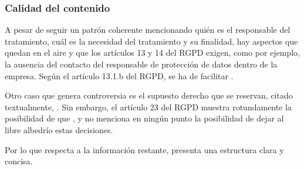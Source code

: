 \subsubsection{Calidad del contenido}
A pesar de seguir un patrón coherente mencionando quién es el responsable del tratamiento, cuál es la necesidad del tratamiento y su finalidad, hay aspectos que quedan en el aire y que los artículos 13 y 14 del RGPD exigen, como por ejemplo, la ausencia del contacto del responsable de protección de datos dentro de la empresa. Según el artículo 13.1.b del RGPD, se ha de facilitar .

Otro caso que genera controversia es el supuesto derecho que se reservan, citado textualmente, . Sin embargo, el artículo 23 del RGPD muestra rotundamente la posibilidad de que , y no menciona en ningún punto la posibilidad de dejar al libre albedrío estas decisiones.

\noindent
Por lo que respecta a la información restante, presenta una estructura clara y concisa.
